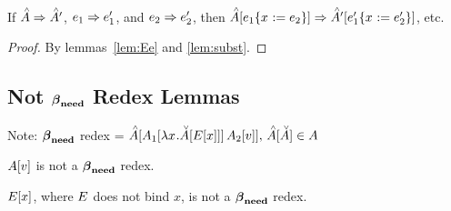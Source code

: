 \documentclass{article}
\begin{document}
\begin{corollary}[Substitution]
If $\Ap \pstep \Ap'$, $\e_1 \pstep \e_1'$, and $\e_2 \pstep \e_2'$, then
$\inAp{\substx{\e_1}{\e_2}} \pstep \inAp[']{\substx{\e_1'}{\e_2'}}$, etc.
\end{corollary}

\begin{proof}
By lemmas~\ref{lem:Ee} and \ref{lem:subst}.
\end{proof}






%
%

\subsection{Not $\betaneednr$ Redex Lemmas}
Note: $\betaneednr$ redex = $\inAp{\ap{\inA[_1]{\lx\inAm{\Ex}}}{\Av[_2]}},\, 
                             \inAp{\Am} \in \A$
\begin{lemma}
\label{lem:Avbeta}
$\Av$ is not a $\betaneednr$ redex.
\end{lemma}

\begin{lemma}
\label{lem:Exbeta}
$\Ex$, where $\E$ does not bind $x$, is not a $\betaneednr$ redex.
\end{lemma}
\end{document}
